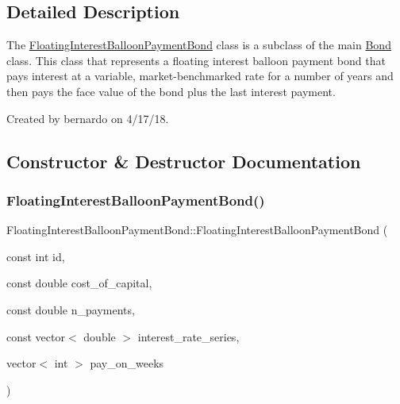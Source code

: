 \subsection{Detailed Description}
The {\ttfamily \mbox{\hyperlink{classFloatingInterestBalloonPaymentBond}{Floating\+Interest\+Balloon\+Payment\+Bond}}} class is a subclass of the main {\ttfamily \mbox{\hyperlink{classBond}{Bond}}} class. This class that represents a floating interest balloon payment bond that pays interest at a variable, market-\/benchmarked rate for a number of years and then pays the face value of the bond plus the last interest payment. 

Created by bernardo on 4/17/18. 

\subsection{Constructor \& Destructor Documentation}
\mbox{\label{classFloatingInterestBalloonPaymentBond_aa42f50447a3dd1bd6959e8c4bd0c2421}} 
\subsubsection{\texorpdfstring{Floating\+Interest\+Balloon\+Payment\+Bond()}{FloatingInterestBalloonPaymentBond()}\hspace{0.1cm}{\footnotesize\ttfamily [1/2]}}
{\footnotesize\ttfamily Floating\+Interest\+Balloon\+Payment\+Bond\+::\+Floating\+Interest\+Balloon\+Payment\+Bond (\begin{DoxyParamCaption}\item[{const int}]{id,  }\item[{const double}]{cost\+\_\+of\+\_\+capital,  }\item[{const double}]{n\+\_\+payments,  }\item[{const vector$<$ double $>$}]{interest\+\_\+rate\+\_\+series,  }\item[{vector$<$ int $>$}]{pay\+\_\+on\+\_\+weeks }\end{DoxyParamCaption})}



